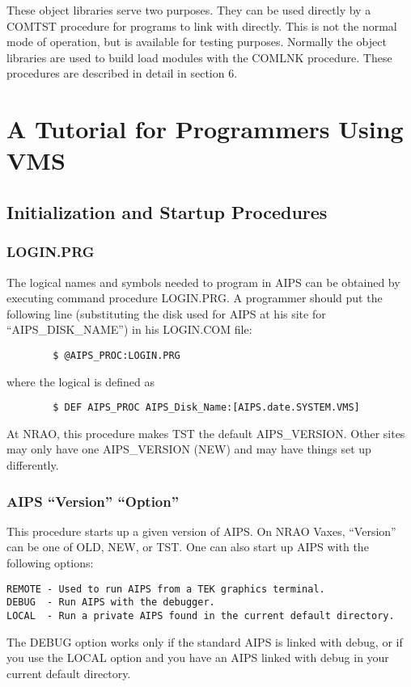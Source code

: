 These object libraries serve two purposes. They can be used directly
by a COMTST procedure for programs to link with directly. This is not
the normal mode of operation, but is available for testing purposes.
Normally the object libraries are used to build load modules with the
COMLNK procedure.  These procedures are described in detail in section
6.

\section{A Tutorial for Programmers Using VMS}
\subsection{Initialization and Startup Procedures}
\subsubsection{LOGIN.PRG}

The logical names and symbols needed to program in AIPS can be
obtained by executing command procedure LOGIN.PRG.  A programmer
should put the following line (substituting the disk used for AIPS at
his site for ``AIPS\_DISK\_NAME'') in his LOGIN.COM file:
\begin{verbatim}
        $ @AIPS_PROC:LOGIN.PRG
\end{verbatim}
where the logical is defined as
\begin{verbatim}
        $ DEF AIPS_PROC AIPS_Disk_Name:[AIPS.date.SYSTEM.VMS]

\end{verbatim}
At NRAO, this procedure makes TST the default AIPS\_VERSION.  Other
sites may only have one AIPS\_VERSION (NEW) and may have things set up
differently.


\subsubsection{AIPS ``Version'' ``Option''}
This procedure starts up a given version of AIPS.  On NRAO Vaxes,
``Version'' can be one of OLD, NEW, or TST.  One can also start up
AIPS with the following options:

\begin{verbatim}
REMOTE - Used to run AIPS from a TEK graphics terminal.
DEBUG  - Run AIPS with the debugger.
LOCAL  - Run a private AIPS found in the current default directory.

\end{verbatim}
The DEBUG option works only if the standard AIPS is linked with debug,
or if you use the LOCAL option and you have an AIPS linked with debug
in your current default directory.

